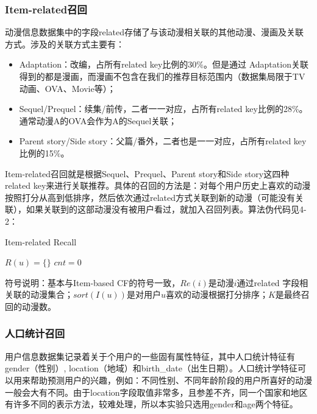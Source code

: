       \subsubsection{Item-related召回}
      动漫信息数据集中的字段related存储了与该动漫相关联的其他动漫、漫画及关联方式。涉及的关联方式主要有：
      \begin{itemize}
        \item Adaptation：改编，占所有related key比例的30\%。但是通过
        Adaptation关联得到的都是漫画，而漫画不包含在我们的推荐目标范围内（数据集局限于TV动画、OVA、Movie等）；
        \item Sequel/Prequel：续集/前传，二者一一对应，占所有related key比例的28\%。通常动漫A的OVA会作为A的Sequel关联；
        \item Parent story/Side story：父篇/番外，二者也是一一对应，占所有related key比例的15\%。
      \end{itemize}
      Item-related召回就是根据Sequel、Prequel、Parent story和Side story这四种related key来进行关联推荐。具体的召回的方法是：对每个用户历史上喜欢的动漫按照打分从高到低排序，然后依次通过related方式关联到新的动漫（可能没有关联），如果关联到的这部动漫没有被用户看过，就加入召回列表。算法伪代码见4-2：
      \begin{algorithm}[htbp]
        \caption{Item-related Recall}
        $R(u)=\{\}$\;
        $cnt=0$\;
      \end{algorithm}

      符号说明：基本与Item-based CF的符号一致，$Re(i)$是动漫$i$通过related
      字段相关联的动漫集合；$sort(I(u))$是对用户$u$喜欢的动漫根据打分排序；$K$是最终召回的动漫数。

      \subsubsection{人口统计召回}
      用户信息数据集记录着关于个用户的一些固有属性特征，其中人口统计特征有gender（性别）, location（地域）和birth\_date（出生日期）。人口统计学特征可以用来帮助预测用户的兴趣，例如：不同性别、不同年龄阶段的用户所喜好的动漫一般会大有不同。由于location字段取值非常多，且参差不齐，同一个国家和地区有许多不同的表示方法，较难处理，所以本实验只选用gender和age两个特征。

